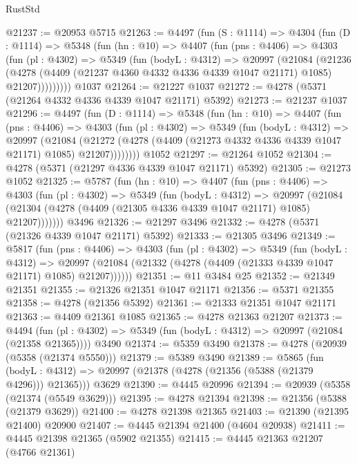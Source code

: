 \begin{lexlean}{RustStd}
\begin{coremodule}
@21237 := @20953 @5715
@21263 := @4497
    (fun (S : @1114) =>
    @4304
      (fun (D : @1114) =>
      @5348
        (fun (hn : @10) =>
        @4407
          (fun (pns : @4406) =>
          @4303
            (fun (pl : @4302) =>
            @5349
              (fun (bodyL : @4312) =>
              @20997
                (@21084
                  (@21236
                    (@4278
                      (@4409 (@21237 @4360 @4332 @4336 @4339 @1047 @21171) @1085)
                      @21207)))))))))
    @1037
@21264 := @21227 @1037
@21272 := @4278 (@5371 (@21264 @4332 @4336 @4339 @1047 @21171) @5392)
@21273 := @21237 @1037
@21296 := @4497
    (fun (D : @1114) =>
    @5348
      (fun (hn : @10) =>
      @4407
        (fun (pns : @4406) =>
        @4303
          (fun (pl : @4302) =>
          @5349
            (fun (bodyL : @4312) =>
            @20997
              (@21084
                (@21272 (@4278 (@4409 (@21273 @4332 @4336 @4339 @1047 @21171) @1085) @21207))))))))
    @1052
@21297 := @21264 @1052
@21304 := @4278 (@5371 (@21297 @4336 @4339 @1047 @21171) @5392)
@21305 := @21273 @1052
@21325 := @5787
    (fun (hn : @10) =>
    @4407
      (fun (pns : @4406) =>
      @4303
        (fun (pl : @4302) =>
        @5349
          (fun (bodyL : @4312) =>
          @20997
            (@21084 (@21304 (@4278 (@4409 (@21305 @4336 @4339 @1047 @21171) @1085) @21207)))))))
    @3496
@21326 := @21297 @3496
@21332 := @4278 (@5371 (@21326 @4339 @1047 @21171) @5392)
@21333 := @21305 @3496
@21349 := @5817
    (fun (pns : @4406) =>
    @4303
      (fun (pl : @4302) =>
      @5349
        (fun (bodyL : @4312) =>
        @20997 (@21084 (@21332 (@4278 (@4409 (@21333 @4339 @1047 @21171) @1085) @21207))))))
@21351 := @11 @3484 @25
@21352 := @21349 @21351
@21355 := @21326 @21351 @1047 @21171
@21356 := @5371 @21355
@21358 := @4278 (@21356 @5392)
@21361 := @21333 @21351 @1047 @21171
@21363 := @4409 @21361 @1085
@21365 := @4278 @21363 @21207
@21373 := @4494
    (fun (pl : @4302) => @5349 (fun (bodyL : @4312) => @20997 (@21084 (@21358 @21365))))
    @3490
@21374 := @5359 @3490
@21378 := @4278 (@20939 (@5358 (@21374 @5550)))
@21379 := @5389 @3490
@21389 := @5865
    (fun (bodyL : @4312) => @20997 (@21378 (@4278 (@21356 (@5388 (@21379 @4296))) @21365)))
    @3629
@21390 := @4445 @20996
@21394 := @20939 (@5358 (@21374 (@5549 @3629)))
@21395 := @4278 @21394
@21398 := @21356 (@5388 (@21379 @3629))
@21400 := @4278 @21398 @21365
@21403 := @21390 (@21395 @21400) @20900
@21407 := @4445 @21394 @21400 (@4604 @20938)
@21411 := @4445 @21398 @21365 (@5902 @21355)
@21415 := @4445 @21363 @21207 (@4766 @21361)

\end{coremodule}
\end{lexlean}
